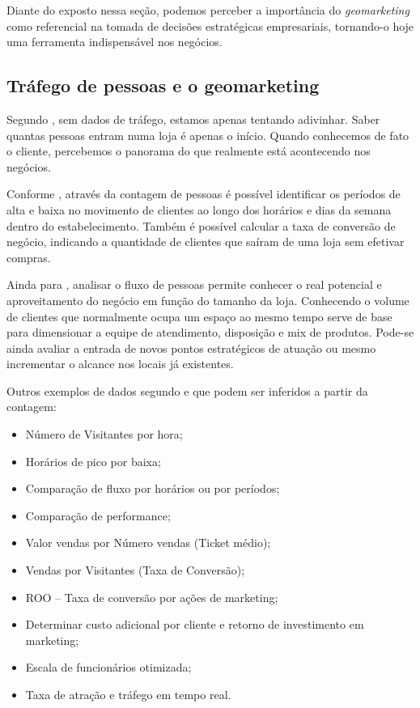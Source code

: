 Diante do exposto nessa seção, podemos perceber a importância do \emph{geomarketing} como
referencial na tomada de decisões estratégicas empresariais, tornando-o hoje uma ferramenta indispensável nos negócios.

\subsection{Tráfego de pessoas e o geomarketing}

Segundo , sem dados de tráfego, estamos apenas tentando adivinhar. Saber quantas pessoas entram numa loja é apenas o início. Quando conhecemos de fato o cliente, percebemos o panorama do que realmente está acontecendo nos negócios.

Conforme , através da contagem de pessoas é possível identificar os períodos de alta e baixa no movimento de clientes ao longo dos horários e dias da semana dentro do estabelecimento. Também é possível calcular a taxa de conversão de negócio, indicando a quantidade de clientes que saíram de uma loja sem efetivar compras. 

Ainda para , analisar o fluxo de pessoas permite conhecer o real potencial e aproveitamento do negócio em função do tamanho da loja. Conhecendo o volume de clientes que normalmente ocupa um espaço ao mesmo tempo serve de base para dimensionar a equipe de atendimento, disposição e mix de produtos. Pode-se ainda avaliar a entrada de novos pontos estratégicos de atuação ou mesmo incrementar o alcance nos locais já existentes. 

Outros exemplos de dados segundo  e  que podem ser inferidos a partir da contagem:

\begin{itemize}
  \item Número de Visitantes por hora;
  \item Horários de pico por baixa;
  \item Comparação de fluxo por horários ou por períodos;
  \item Comparação de performance;
  \item Valor vendas por Número vendas (Ticket médio);
  \item Vendas por Visitantes (Taxa de Conversão);
  \item ROO – Taxa de conversão por ações de marketing;
  \item Determinar custo adicional por cliente e retorno de investimento em marketing;
  \item Escala de funcionários otimizada;
  \item Taxa de atração e tráfego em tempo real.
\end{itemize}

